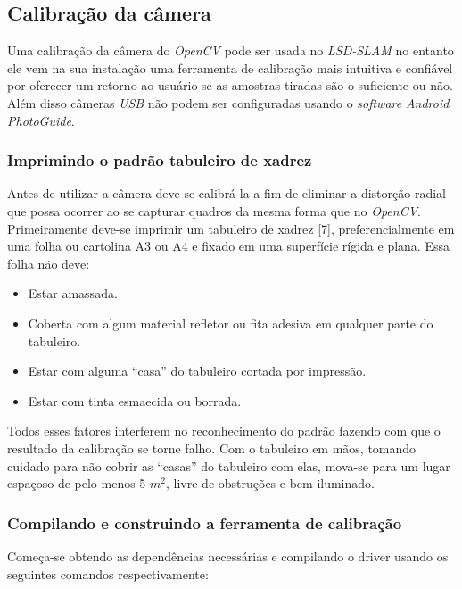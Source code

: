 \subsection{Calibração da câmera}

Uma calibração da câmera do \textit{OpenCV} pode ser usada no \textit{LSD-SLAM} no entanto ele vem na sua instalação uma ferramenta de calibração mais intuitiva e confiável por oferecer um retorno ao usuário se as amostras tiradas são o suficiente ou não. Além disso câmeras \textit{USB} não podem ser configuradas usando o \textit{software} \textit{Android} \textit{PhotoGuide}.

\subsubsection{Imprimindo o padrão tabuleiro de xadrez}

Antes de utilizar a câmera deve-se calibrá-la a fim de eliminar a distorção radial que possa ocorrer ao se capturar quadros da mesma forma que no \textit{OpenCV}.
Primeiramente deve-se imprimir um tabuleiro de xadrez [7], preferencialmente em uma folha ou cartolina A3 ou A4 e fixado em uma superfície rígida e plana. Essa folha não deve: 

\begin{itemize}
	\item{Estar amassada.}
	\item{Coberta com algum material refletor ou fita adesiva em qualquer parte do tabuleiro.}
	\item{Estar com alguma “casa” do tabuleiro cortada por impressão.}
	\item{Estar com tinta esmaecida ou borrada.}
\end{itemize}	

Todos esses fatores interferem no reconhecimento do padrão fazendo com que o resultado da calibração se torne falho. Com o tabuleiro em mãos, tomando cuidado para não cobrir as “casas” do tabuleiro com elas, mova-se para um lugar espaçoso de pelo menos 5 $m^2$, livre de obstruções e bem iluminado.

\subsubsection{Compilando e construindo a ferramenta de calibração}

Começa-se obtendo as dependências necessárias e compilando o driver usando os seguintes comandos respectivamente:

